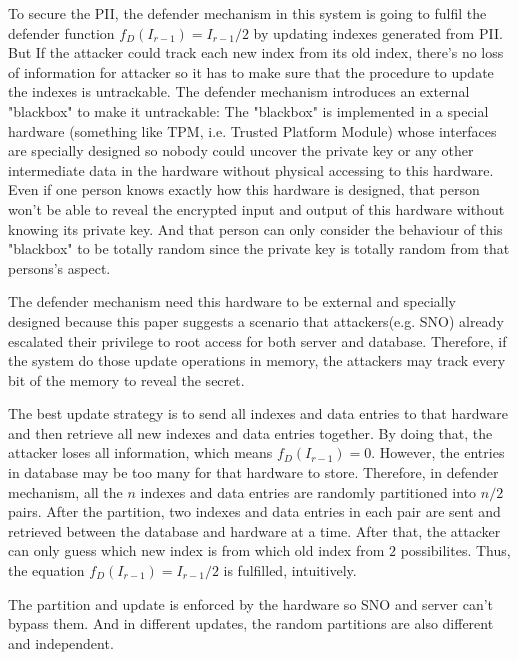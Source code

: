\documentclass[10pt, conference, compsocconf]{IEEEtran}
\begin{document}
		To secure the PII,
        the defender mechanism in this system is going to fulfil the defender
        function $f_D(I_{r-1}) = I_{r-1}/2$ by updating indexes generated from PII.
        But If the attacker
        could track each new index from its old index, there's no loss of information
        for attacker so it has to make sure that the procedure to update the indexes
        is untrackable.
        The defender mechanism introduces an external "blackbox" to make it untrackable:
		The "blackbox" is implemented in a special hardware (something
        like TPM, i.e. Trusted Platform Module) whose interfaces are
        specially designed so nobody could uncover the private key or any other
        intermediate data in the hardware without physical accessing to this hardware.
        Even if one person knows exactly how this hardware is designed, that person won't
        be able to reveal the encrypted input and output of this hardware without knowing
        its private key. And that person
        can only consider the behaviour of this "blackbox" to be totally random since
        the private key is totally random from that persons's aspect.
        
        The defender mechanism need this hardware to be external and specially designed because
        this paper suggests a scenario that attackers(e.g. SNO) already
        escalated their privilege to root access for
        both server and database. Therefore, if the system do those update operations
        in memory, the attackers may track every bit of the memory to reveal the secret.

        The best update strategy
        is to send all indexes and data entries to that hardware and then
        retrieve all new indexes and data entries together. By doing that, the attacker
        loses all information, which means $f_D(I_{r-1}) = 0$. However, the entries
        in database may be too many for that hardware to store. Therefore, in defender mechanism,
        all the $n$ indexes and data entries are randomly partitioned into
        $n/2$ pairs.
        After the partition,
        two indexes and data entries in each pair are sent and retrieved
        between the database and hardware at a time. After that, the attacker can
        only guess which new index is from which old index from $2$ possibilites.
        Thus, the equation $f_D(I_{r-1}) = I_{r-1}/2$ is fulfilled, intuitively.

        The partition and update is enforced by the hardware so SNO
        and server can't bypass them. And in
        different updates, the random partitions are also different
        and independent.
\end{document}
